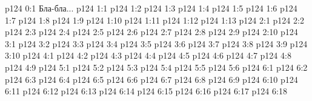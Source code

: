 \author{Промежуточные создания}
\vs p124 0:1  Бла-бла...
\vs p124 1:1 
\vs p124 1:2 
\vs p124 1:3 \pc 
\vs p124 1:4 
\vs p124 1:5 
\vs p124 1:6 \pc 
\vs p124 1:7 \pc 
\vs p124 1:8 \pc 
\vs p124 1:9 
\vs p124 1:10 
\vs p124 1:11 \pc 
\vs p124 1:12 
\vs p124 1:13 
\vs p124 2:1 
\vs p124 2:2 \pc 
\vs p124 2:3 
\vs p124 2:4 \pc 
\vs p124 2:5 
\vs p124 2:6 
\vs p124 2:7 
\vs p124 2:8 
\vs p124 2:9 
\vs p124 2:10 
\vs p124 3:1 
\vs p124 3:2 
\vs p124 3:3 
\vs p124 3:4 \pc 
\vs p124 3:5 
\vs p124 3:6 \pc 
\vs p124 3:7 
\vs p124 3:8 
\vs p124 3:9 
\vs p124 3:10 
\vs p124 4:1 
\vs p124 4:2 
\vs p124 4:3 
\vs p124 4:4 \pc 
\vs p124 4:5 
\vs p124 4:6 
\vs p124 4:7 \pc 
\vs p124 4:8 
\vs p124 4:9 
\vs p124 5:1 
\vs p124 5:2 
\vs p124 5:3 \pc 
\vs p124 5:4 \pc 
\vs p124 5:5 
\vs p124 5:6 
\vs p124 6:1 
\vs p124 6:2 
\vs p124 6:3 
\vs p124 6:4 
\vs p124 6:5 
\vs p124 6:6 \pc 
\vs p124 6:7 
\vs p124 6:8 
\vs p124 6:9 
\vs p124 6:10 
\vs p124 6:11 
\vs p124 6:12 
\vs p124 6:13 
\vs p124 6:14 
\vs p124 6:15 \pc 
\vs p124 6:16 
\vs p124 6:17 
\vs p124 6:18 \pc 
\quizlink
